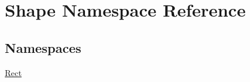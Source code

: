 \hypertarget{namespace_shape}{}\section{Shape Namespace Reference}
\label{namespace_shape}
\subsection*{Namespaces}
\begin{DoxyCompactItemize}
\item 
 \mbox{\hyperlink{namespace_shape_1_1_rect}{Rect}}
\end{DoxyCompactItemize}

